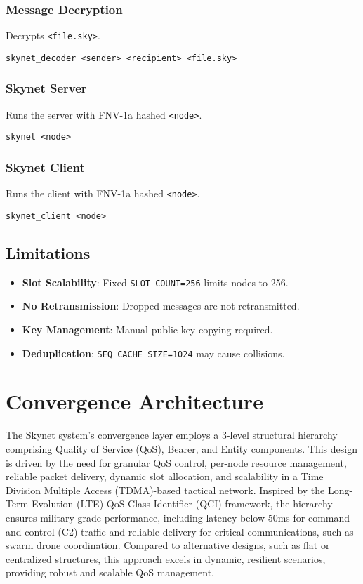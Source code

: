 \documentclass{article}
\begin{document}
\subsubsection*{Message Decryption}
Decrypts \texttt{<file.sky>}.
\begin{lstlisting}
skynet_decoder <sender> <recipient> <file.sky>
\end{lstlisting}

\subsubsection*{Skynet Server}
Runs the server with FNV-1a hashed \texttt{<node>}.
\begin{lstlisting}
skynet <node>
\end{lstlisting}

\subsubsection*{Skynet Client}
Runs the client with FNV-1a hashed \texttt{<node>}.
\begin{lstlisting}
skynet_client <node>
\end{lstlisting}

\subsection{Limitations}
\begin{itemize}
    \item \textbf{Slot Scalability}: Fixed \texttt{SLOT\_COUNT=256} limits nodes to 256.
    \item \textbf{No Retransmission}: Dropped messages are not retransmitted.
    \item \textbf{Key Management}: Manual public key copying required.
    \item \textbf{Deduplication}: \texttt{SEQ\_CACHE\_SIZE=1024} may cause collisions.
\end{itemize}

\section{Convergence Architecture}
The Skynet system's convergence layer employs a 3-level structural hierarchy comprising Quality of
Service (QoS), Bearer, and Entity components. This design is driven by the need for granular QoS
control, per-node resource management, reliable packet delivery, dynamic slot allocation, and
scalability in a Time Division Multiple Access (TDMA)-based tactical network. Inspired by the
Long-Term Evolution (LTE) QoS Class Identifier (QCI) framework, the hierarchy ensures military-grade
performance, including latency below 50ms for command-and-control (C2) traffic and reliable delivery
for critical communications, such as swarm drone coordination. Compared to alternative designs, such
as flat or centralized structures, this approach excels in dynamic, resilient scenarios, providing
robust and scalable QoS management.
\end{document}
